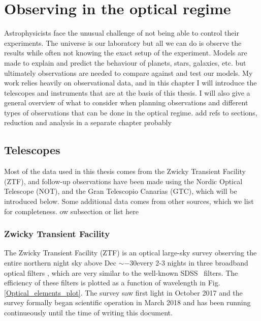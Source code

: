 \documentclass[a4paper,oneside,12pt, class=Latex/Classes/PhDthesisPSnPDF, crop=false]{standalone}
\begin{document}
\doublespacing
\chapter{Observing in the optical regime}
\label{chap:obs}

Astrophysicists face the unusual challenge of not being able to control their experiments. The universe is our laboratory but all we can do is observe the results while often not knowing the exact setup of the experiment. Models are made to explain and predict the behaviour of planets, stars, galaxies, etc. but ultimately observations are needed to compare against and test our models. My work relies heavily on observational data, and in this chapter I will introduce the telescopes and instruments that are at the basis of this thesis. I will also give a general overview of what to consider when planning observations and different types of observations that can be done in the optical regime. \color{red}add refs to sections, reduction and analysis in a separate chapter probably \color{black}


\section{Telescopes}
Most of the data used in this thesis comes from the Zwicky Transient Facility (ZTF), and follow-up observations have been made using the Nordic Optical Telescope (NOT), and the Gran Telescopio Canarias (GTC), which will be introduced below. Some additional data comes from other sources, which we list for completeness. \color{red}ow subsection or list here \color{black}

\subsection{Zwicky Transient Facility}
The Zwicky Transient Facility (ZTF) is an optical large-sky survey observing the entire northern night sky above Dec $\sim-30$\degree every 2-3 nights in three broadband optical filters \ztfg\ztfr\ztfi, which are very similar to the well-known SDSS \ztfg\ztfr\ztfi\ filters. The efficiency of these filters is plotted as a function of wavelength in Fig. \ref{Optical_elements_plot}. The survey saw first light in October 2017 and the survey formally began scientific operation in March 2018 and has been running continueously until the time of writing this document.
\end{document}

